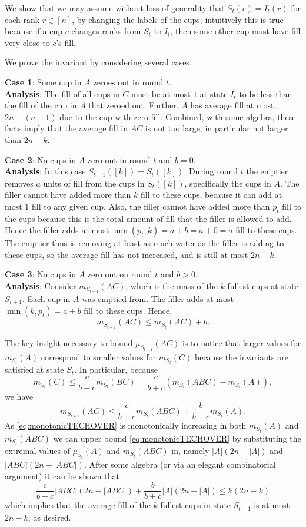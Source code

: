 We show that we may assume without loss of generality that
$S_t(r) = I_t(r)$ for each rank $r \in [n]$, by changing the
labels of the cups; intuitively this is true because if a cup $c$
changes ranks from $S_t$ to $I_t$, then some other cup must have
fill very close to $c$'s fill.

We prove the invariant by considering several cases.

\noindent\textbf{Case 1}:
Some cup in $A$ zeroes out in round $t$.\\
\textbf{Analysis}:
The fill of all cups in $C$ must be at most $1$ at state $I_t$ to be
less than the fill of the cup in $A$ that zeroed out. Further,
$A$ has average fill at most $2n-(a-1)$ due to the cup with zero
fill. Combined, with some algebra, these facts imply that the
average fill in $AC$ is not too large, in particular not larger
than $2n-k$.

\noindent\textbf{Case 2}:
No cups in $A$ zero out in round $t$ and $b=0$.\\
\textbf{Analysis}:
In this case $S_{t+1}([k]) = S_t([k])$.
During round $t$ the emptier removes $a$ units of fill from the
cups in $S_t([k])$, specifically the cups in $A$. The filler
cannot have added more than $k$ fill to these cups, because it
can add at most $1$ fill to any given cup. Also, the filler
cannot have added more than $p_t$ fill to the cups because this
is the total amount of fill that the filler is allowed to add.
Hence the filler adds at most $\min(p_t, k) = a+b=a+0=a$ fill to
these cups.
The emptier thus is removing at least as much water as the filler
is adding to these cups, so the average fill has not increased,
and is still at most $2n-k$.

\noindent\textbf{Case 3}:
No cups in $A$ zero out on round $t$ and $b > 0$.\\
\textbf{Analysis}:
Consider $m_{S_{t+1}}(AC)$, which is the mass of the $k$ fullest
cups at state $S_{t+1}$. Each cup in $A$ was emptied from. The
filler adds at most $\min(k, p_t) = a+b$ fill to these cups.
Hence, 
$$m_{S_{t+1}}(AC) \le m_{S_t}(AC) + b.$$

The key insight necessary to bound $\mu_{S_{t+1}}(AC)$ is to
notice that larger values for $m_{S_t}(A)$ correspond to smaller
values for $m_{S_t}(C)$ because the invariants are satisfied at
state $S_t$.
In particular, because
$$m_{S_t}(C) \le \frac{c}{b+c} m_{S_t}(BC) = \frac{c}{b+c}(m_{S_t}(ABC) - m_{S_t}(A)),$$
we have 
\begin{equation}
  \label{eq:monotonicTECHOVER}
  m_{S_{t+1}}(AC) \le \frac{c}{b+c}m_{S_t}(ABC) + \frac{b}{b+c}m_{S_t}(A).
\end{equation}
As \eqref{eq:monotonicTECHOVER} is monotonically increasing in
both $m_{S_t}(A)$ and $m_{S_t}(ABC)$ we can upper bound
\eqref{eq:monotonicTECHOVER} by substituting the extremal values
of $\mu_{S_t}(A)$ and $m_{S_t}(ABC)$ in, namely $|A|(2n-|A|)$ and
$|ABC|(2n-|ABC|)$.
After some algebra (or via an elegant combinatorial argument) it can be shown that 
$$\frac{c}{b+c}|ABC|(2n-|ABC|) + \frac{b}{b+c}|A|(2n-|A|) \le k(2n-k)$$
which implies that the average fill of the $k$ fullest cups in
state $S_{t+1}$ is at most $2n-k$, as desired.

